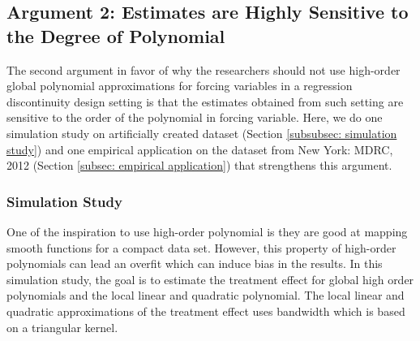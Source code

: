 \documentclass[fleqn]{article}
\begin{document}
    \subsection{Argument 2: Estimates are Highly Sensitive to the Degree of Polynomial}
    \label{subsec: arg2}

    The second argument in favor of why the researchers should not use high-order global polynomial approximations for forcing variables in a regression discontinuity design setting is that the estimates obtained from such setting are sensitive to the order of the polynomial in forcing variable. Here, we do one simulation study on artificially created dataset (Section \ref{subsubsec: simulation study}) and one empirical application on the dataset from New York: MDRC, 2012\cite{jacob2012practical} (Section \ref{subsec: empirical application}) that strengthens this argument. 

    \subsubsection{Simulation Study}
    \label{subsubsec: arg2 sim study}

    One of the inspiration to use high-order polynomial is they are good at mapping smooth functions for a compact data set. However, this property of high-order polynomials can lead an overfit which can induce bias in the results. In this simulation study, the goal is to estimate the treatment effect for global high order polynomials and the local linear and quadratic polynomial. The local linear and quadratic approximations of the treatment effect uses bandwidth which is based on a triangular kernel.\\
\end{document}
